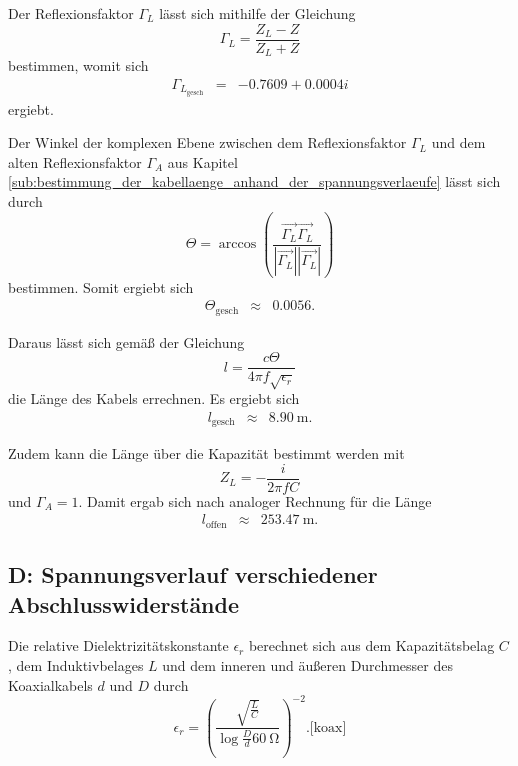 Der Reflexionsfaktor $\Gamma_L$ lässt sich mithilfe der Gleichung
\begin{equation*}
	\Gamma_L = \frac{Z_L-Z}{Z_L+Z}
\end{equation*}
bestimmen, womit sich
\begin{eqnarray*}
	\Gamma_{L_\text{gesch}} &=& -0.7609 + 0.0004i
\end{eqnarray*}
ergiebt.

Der Winkel der komplexen Ebene zwischen dem Reflexionsfaktor $\Gamma_L$ und dem alten Reflexionsfaktor $\Gamma_A$ aus Kapitel \ref{sub:bestimmung_der_kabellaenge_anhand_der_spannungsverlaeufe} lässt sich durch
\begin{equation*}
	\Theta = \arccos \left(\frac{\vec{\Gamma_L}\vec{\Gamma_L}}{|\vec{\Gamma_L}||\vec{\Gamma_L}|}\right)
\end{equation*}
bestimmen.
Somit ergiebt sich
\begin{eqnarray*}
	\Theta_\text{gesch} &\approx& 0.0056.
\end{eqnarray*}

Daraus lässt sich gemäß der Gleichung
\begin{equation*}
	l = \frac{c \Theta}{4 \pi f \sqrt{\epsilon_r}}
\end{equation*}
die Länge des Kabels errechnen.
Es ergiebt sich
\begin{eqnarray*}
	l_\text{gesch} &\approx& \SI{8.90}{\meter}.
\end{eqnarray*}

Zudem kann die Länge über die Kapazität bestimmt werden mit
\begin{equation*}
	Z_L = -\frac{i}{2 \pi f C}
\end{equation*}
und $\Gamma_A = 1$.
Damit ergab sich nach analoger Rechnung für die Länge
\begin{eqnarray*}
	l_\text{offen} &\approx& \SI{253.47}{\meter}.
\end{eqnarray*}

\FloatBarrier
\subsection{D: Spannungsverlauf verschiedener Abschlusswiderstände} %
\label{sub:spannungsverlauf_verschiedener_abschlusswiderstaende}

Die relative Dielektrizitätskonstante $\epsilon_r$ berechnet sich aus dem Kapazitätsbelag $C$, dem Induktivbelages $L$ und dem inneren und äußeren Durchmesser des Koaxialkabels $d$ und $D$ durch
\begin{equation*}
	\epsilon_r = \left(\frac{\sqrt{\frac{L}{C}}}{\log{\frac{D}{d}} \SI{60}{\ohm}}\right)^{-2}. \text{[koax]} 
\end{equation*}

